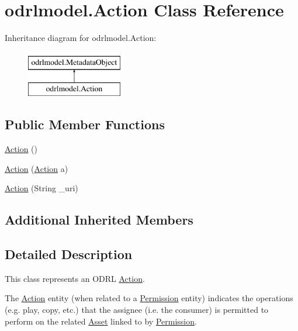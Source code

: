 \hypertarget{classodrlmodel_1_1_action}{\section{odrlmodel.\-Action Class Reference}
\label{classodrlmodel_1_1_action}
}
Inheritance diagram for odrlmodel.\-Action\-:\begin{figure}[H]
\begin{center}
\leavevmode
\includegraphics[height=2.000000cm]{classodrlmodel_1_1_action}
\end{center}
\end{figure}
\subsection*{Public Member Functions}
\begin{DoxyCompactItemize}
\item 
\hyperlink{classodrlmodel_1_1_action_aba2aea2da231fcdfa327f82f9408a2ac}{Action} ()
\item 
\hyperlink{classodrlmodel_1_1_action_a8b58d562806a42c51959f257cbc5e8c8}{Action} (\hyperlink{classodrlmodel_1_1_action}{Action} a)
\item 
\hyperlink{classodrlmodel_1_1_action_a94997efd5b4b9b2c6baa428767199e41}{Action} (String \-\_\-uri)
\end{DoxyCompactItemize}
\subsection*{Additional Inherited Members}


\subsection{Detailed Description}
This class represents an O\-D\-R\-L \hyperlink{classodrlmodel_1_1_action}{Action}.

The \hyperlink{classodrlmodel_1_1_action}{Action} entity (when related to a \hyperlink{classodrlmodel_1_1_permission}{Permission} entity) indicates the operations (e.\-g. play, copy, etc.) that the assignee (i.\-e. the consumer) is permitted to perform on the related \hyperlink{classodrlmodel_1_1_asset}{Asset} linked to by \hyperlink{classodrlmodel_1_1_permission}{Permission}.

